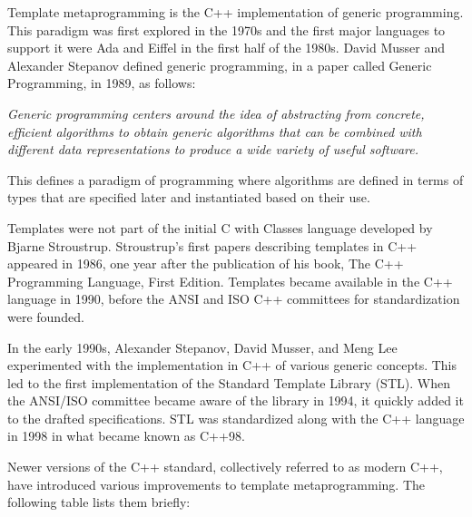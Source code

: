 Template metaprogramming is the C++ implementation of generic programming. This paradigm was first explored in the 1970s and the first major languages to support it were Ada and Eiffel in the first half of the 1980s. David Musser and Alexander Stepanov defined generic programming, in a paper called Generic Programming, in 1989, as follows:

\textit{Generic programming centers around the idea of abstracting from concrete, efficient algorithms to obtain generic algorithms that can be combined with different data representations to produce a wide variety of useful software.}

This defines a paradigm of programming where algorithms are defined in terms of types that are specified later and instantiated based on their use.

Templates were not part of the initial C with Classes language developed by Bjarne Stroustrup. Stroustrup's first papers describing templates in C++ appeared in 1986, one year after the publication of his book, The C++ Programming Language, First Edition. Templates became available in the C++ language in 1990, before the ANSI and ISO C++ committees for standardization were founded.

In the early 1990s, Alexander Stepanov, David Musser, and Meng Lee experimented with the implementation in C++ of various generic concepts. This led to the first implementation of the Standard Template Library (STL). When the ANSI/ISO committee became aware of the library in 1994, it quickly added it to the drafted specifications. STL was standardized along with the C++ language in 1998 in what became known as C++98.

Newer versions of the C++ standard, collectively referred to as modern C++, have introduced various improvements to template metaprogramming. The following table lists them briefly:

